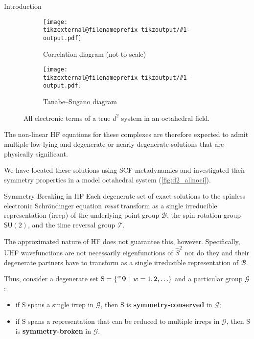 \documentclass[final, xcolor={svgnames}]{beamer}
\makeatletter
\newif\iftikzex
\newcommand*{\useexternalfile}[1]{%
		\iftikzex
			\tikzsetnextfilename{tikzoutput/#1-output}%
			\scalebox{1}{}
		\else
			\texttt{[image: \\tikzexternal@filenameprefix tikzoutput/\#1-output.pdf]}
		\fi
	}
\newlength{\colwidth}
\makeatother
\begin{document}
\begin{frame}[t]
\begin{columns}[t]
\begin{column}{\colwidth}
\begin{block}{Introduction}
				\begin{figure}
					\begin{subfigure}[b]{0.49\textwidth}
						\centering
						\useexternalfile{corrd2}
						\caption{Correlation diagram (not to scale)}
					\end{subfigure}
					\hfill
					\begin{subfigure}[b]{0.49\textwidth}
						\centering
						\useexternalfile{TSd2}
						\caption{Tanabe--Sugano diagram}
					\end{subfigure}
					\caption{All electronic terms of a true $d^2$ system in an octahedral field.}
					\label{fig:corrTSd2}
				\end{figure}
				
			The non-linear HF equations for these complexes are therefore expected to admit multiple low-lying and degenerate or nearly degenerate solutions that are physically significant.
			
			We have located these solutions using SCF metadynamics\autocite{article:Thom2008} and investigated their symmetry properties in a model octahedral  system (\cref{fig:d2_allnoci}).
	  	\end{block}
	
		\begin{block}{Symmetry Breaking in HF}
			Each degenerate set of exact solutions to the spinless electronic Schr\"{o}ndinger equation \emph{must} transform as a single irreducible representation (irrep) of the underlying point group $\mathcal{B}$, the spin rotation group $\mathsf{SU}(2)$, and the time reversal group $\mathcal{T}$.
			
			The approximated nature of HF does not guarantee this, however. Specifically, UHF wavefunctions are not necessarily eigenfunctions of $\hat{S}^2$ nor do they and their degenerate partners have to transform as a single irreducible representation of $\mathcal{B}$.
			
			Thus, consider a degenerate set %
				$\mathrm{S} =
					\left\lbrace
						\prescript{w}{}{\Psi} %
						\ | \ %
						w = 1, 2, \ldots %
					\right\rbrace%
				$ %
			and a particular group $\mathcal{G}$:
				\begin{itemize}
					\item if $\mathrm{S}$ spans a single irrep in $\mathcal{G}$, then $\mathrm{S}$ is \textbf{symmetry-conserved} in $\mathcal{G}$;
					\item if $\mathrm{S}$ spans a representation that can be reduced to multiple
					irreps in $\mathcal{G}$, then $\mathrm{S}$ is \textbf{symmetry-broken} in $\mathcal{G}$.
				\end{itemize}


\end{block}
\end{column}
\end{columns}
\end{frame}
\end{document}
